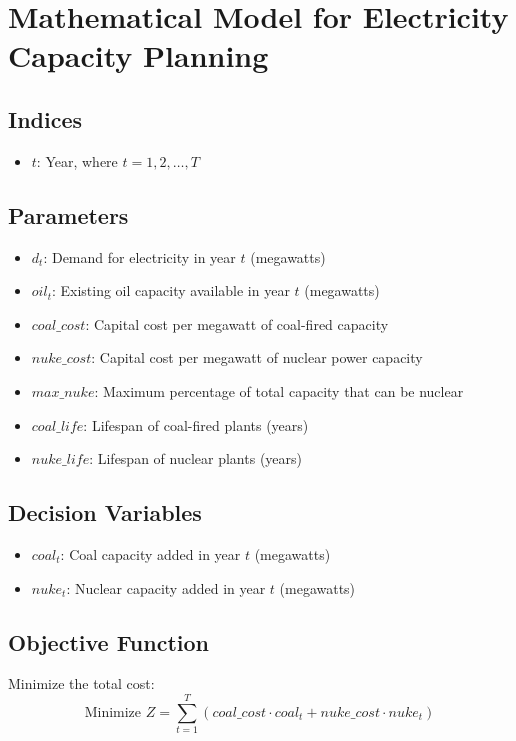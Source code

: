 \documentclass{article}
\begin{document}
\section*{Mathematical Model for Electricity Capacity Planning}

\subsection*{Indices}
\begin{itemize}
    \item \( t \): Year, where \( t = 1, 2, \ldots, T \)
\end{itemize}

\subsection*{Parameters}
\begin{itemize}
    \item \( d_t \): Demand for electricity in year \( t \) (megawatts)
    \item \( oil_t \): Existing oil capacity available in year \( t \) (megawatts)
    \item \( coal\_cost \): Capital cost per megawatt of coal-fired capacity
    \item \( nuke\_cost \): Capital cost per megawatt of nuclear power capacity
    \item \( max\_nuke \): Maximum percentage of total capacity that can be nuclear
    \item \( coal\_life \): Lifespan of coal-fired plants (years)
    \item \( nuke\_life \): Lifespan of nuclear plants (years)
\end{itemize}

\subsection*{Decision Variables}
\begin{itemize}
    \item \( coal_t \): Coal capacity added in year \( t \) (megawatts)
    \item \( nuke_t \): Nuclear capacity added in year \( t \) (megawatts)
\end{itemize}

\subsection*{Objective Function}
Minimize the total cost:
\[
\text{Minimize } Z = \sum_{t=1}^{T} (coal\_cost \cdot coal_t + nuke\_cost \cdot nuke_t)
\]
\end{document}
